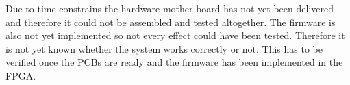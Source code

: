 Due to time constrains the hardware mother board has not yet been delivered and therefore it could not be assembled and tested altogether. The firmware is also not yet implemented so not every effect could have been tested. Therefore it is not yet known whether the system works correctly or not. This has to be verified once the PCBs are ready and the firmware has been implemented in the FPGA. 
